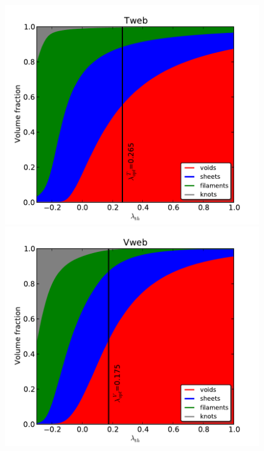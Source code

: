 \documentclass[a4,useAMS,usenatbib,usegraphicx]{latex/mn2e}
\begin{document}
\begin{flushleft}
\begin{figure}
\centering

  \includegraphics[trim = 2mm 2mm 5mm 6mm, clip, keepaspectratio=true,
  width=0.3\textheight]{./figures/cosmicweb_volume_Tweb.pdf}
  \includegraphics[trim = 2mm 2mm 5mm 6mm, clip, keepaspectratio=true,
  width=0.3\textheight]{./figures/cosmicweb_volume_Vweb.pdf}  
  

\end{figure}
\end{flushleft}
\end{document}

